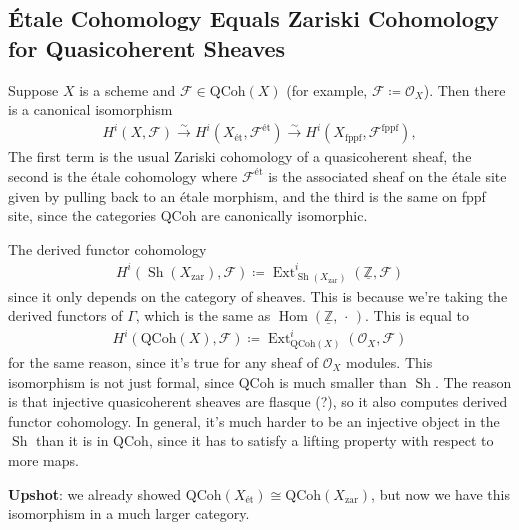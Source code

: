 \hypertarget{uxe9tale-cohomology-equals-zariski-cohomology-for-quasicoherent-sheaves}{%
\subsection{Étale Cohomology Equals Zariski Cohomology for Quasicoherent
Sheaves}\label{uxe9tale-cohomology-equals-zariski-cohomology-for-quasicoherent-sheaves}}

\begin{theorem}\label{thm:et_qcs_zar}

Suppose \(X\) is a scheme and \(\mathcal{F}\in {\mathrm{QCoh}}(X)\) (for
example, \(\mathcal{F} \coloneqq{\mathcal{O}}_X\)). Then there is a
canonical isomorphism
\begin{align*}  
H^i(X, \mathcal{F}) \xrightarrow{\sim} H^i(X_\text{ét}, \mathcal{F}^{\text{ét}}) \xrightarrow{\sim} H^i(X_{\mathrm{\operatorname{fppf}}}, \mathcal{F}^{\mathrm{\operatorname{fppf}}})
,\end{align*}
The first term is the usual Zariski cohomology of a quasicoherent sheaf,
the second is the étale cohomology where \(\mathcal{F}^{\text{ét}}\) is
the associated sheaf on the étale site given by pulling back to an étale
morphism, and the third is the same on fppf site, since the categories
\({\mathrm{QCoh}}\) are canonically isomorphic.

\end{theorem}

\begin{remark}

The derived functor cohomology
\begin{align*}
H^i({\operatorname{Sh}}(X_{{\mathrm{zar}}}), \mathcal{F}) \coloneqq\operatorname{Ext}^i_{{\operatorname{Sh}}(X_{\mathrm{zar}})}(\underline{{\mathbb{Z}}}, \mathcal{F})
\end{align*}
since it only depends on the category of sheaves. This is because we're
taking the derived functors of \(\Gamma\), which is the same as
\({\operatorname{Hom}}(\underline{{\mathbb{Z}}}, {\,\cdot\,})\). This is
equal to
\begin{align*}
H^i({\mathrm{QCoh}}(X), \mathcal{F}) \coloneqq\operatorname{Ext}^i_{{\mathrm{QCoh}}(X)}({\mathcal{O}}_X, \mathcal{F})
\end{align*}
for the same reason, since it's true for any sheaf of
\({\mathcal{O}}_X\) modules. This isomorphism is not just formal, since
\({\mathrm{QCoh}}\) is much smaller than \({\operatorname{Sh}}\). The
reason is that injective quasicoherent sheaves are flasque (?), so it
also computes derived functor cohomology. In general, it's much harder
to be an injective object in the \({\operatorname{Sh}}\) than it is in
\({\mathrm{QCoh}}\), since it has to satisfy a lifting property with
respect to more maps.

\textbf{Upshot}: we already showed
\({\mathrm{QCoh}}(X_\text{ét}) \cong {\mathrm{QCoh}}(X_{\mathrm{zar}})\),
but now we have this isomorphism in a much larger category.

\end{remark}

